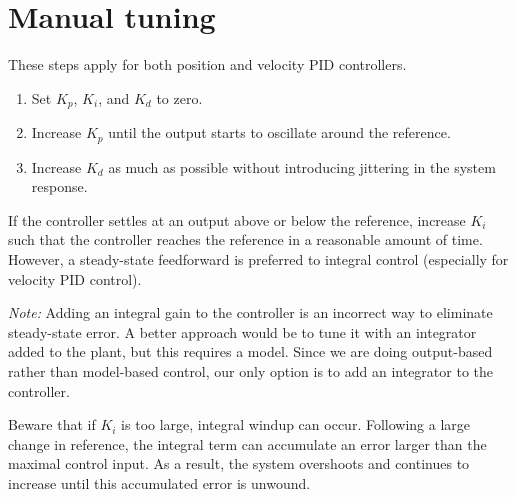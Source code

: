 \section{Manual tuning}

These steps apply for both position and velocity PID controllers.

\begin{enumerate}
  \item Set $K_p$, $K_i$, and $K_d$ to zero.
  \item Increase $K_p$ until the \gls{output} starts to oscillate around the
    \gls{reference}.
  \item Increase $K_d$ as much as possible without introducing jittering in the
    \gls{system response}.
\end{enumerate}

If the \gls{controller} settles at an \gls{output} above or below the
\gls{reference}, increase $K_i$ such that the \gls{controller} reaches the
\gls{reference} in a reasonable amount of time. However, a steady-state
feedforward is preferred to integral control (especially for velocity PID
control).

\begin{remark}
  \textit{Note:} Adding an integral gain to the \gls{controller} is an incorrect
  way to eliminate \gls{steady-state error}. A better approach would be to tune
  it with an integrator added to the \gls{plant}, but this requires a
  \gls{model}. Since we are doing output-based rather than model-based control,
  our only option is to add an integrator to the \gls{controller}.
\end{remark}

Beware that if $K_i$ is too large, integral windup can occur. Following a large
change in \gls{reference}, the integral term can accumulate an error larger than
the maximal \gls{control input}. As a result, the system overshoots and
continues to increase until this accumulated error is unwound.
